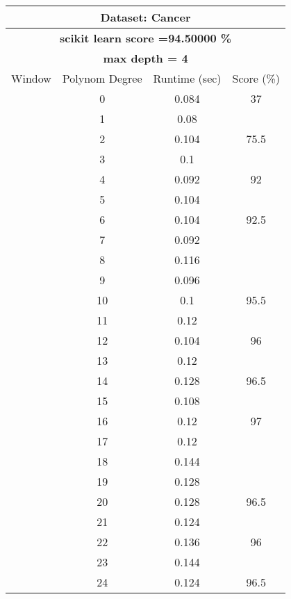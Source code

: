 \documentclass{article}
\begin{document}
\begin{multicols}{2}
\begin{table}[H]
\caption{}
\label{tab:my-table}
\begin{tabular}{|c|c|c|c|}
\hline
\multicolumn{4}{|c|}{\textbf{Dataset: Cancer}} \\ \hline
\multicolumn{4}{|c|}{\textbf{scikit learn score =94.50000  \%}} \\ \hline
\multicolumn{4}{|c|}{\textbf{max depth = 4}} \\ \hline
Window & Polynom Degree & Runtime (sec)& Score (\%) \\ \hline
 & 0 & 0.084 & 37 \\ \cline{2-4} 
 & 1 & 0.08 &  \\ \cline{2-3}
 & 2 & 0.104 & \multirow{-2}{*}{75.5} \\ \cline{2-4} 
 & 3 & 0.1 &  \\ \cline{2-3}
 & 4 & 0.092 & \multirow{-2}{*}{92} \\ \cline{2-4} 
 & 5 & 0.104 &  \\ \cline{2-3}
 & 6 & 0.104 & \multirow{-2}{*}{92.5} \\ \cline{2-4} 
 & 7 & 0.092 &  \\ \cline{2-3}
 & 8 & 0.116 &  \\ \cline{2-3}
 & 9 & 0.096 &  \\ \cline{2-3}
 & 10 & 0.1 & \multirow{-4}{*}{95.5} \\ \cline{2-4} 
 & 11 & 0.12 &  \\ \cline{2-3}
 & 12 & 0.104 & \multirow{-2}{*}{96} \\ \cline{2-4} 
 & 13 & 0.12 &  \\ \cline{2-3}
 & 14 & 0.128 & \multirow{-2}{*}{96.5} \\ \cline{2-4} 
 & \cellcolor[HTML]{FFFFC7}15 & \cellcolor[HTML]{FFFFC7}0.108 & \cellcolor[HTML]{FFFFC7} \\ \cline{2-3}
 & 16 & 0.12 & \multirow{-2}{*}{\cellcolor[HTML]{FFFFC7}97} \\ \cline{2-4} 
 & 17 & 0.12 &  \\ \cline{2-3}
 & 18 & 0.144 &  \\ \cline{2-3}
 & 19 & 0.128 &  \\ \cline{2-3}
 & 20 & 0.128 & \multirow{-4}{*}{96.5} \\ \cline{2-4} 
 & 21 & 0.124 &  \\ \cline{2-3}
 & 22 & 0.136 & \multirow{-2}{*}{96} \\ \cline{2-4} 
 & 23 & 0.144 &  \\ \cline{2-3}
 & 24 & 0.124 & \multirow{-2}{*}{96.5} \\ \cline{2-4} 

\end{tabular}
\end{table}
\end{multicols}
\end{document}
